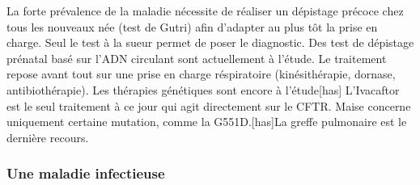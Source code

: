 \documentclass[12pt,a4paper]{article}
\begin{document}
La forte prévalence de la maladie nécessite de réaliser un dépistage précoce chez tous les nouveaux née (test de Gutri) afin d’adapter au plus tôt la prise en charge. Seul le test à la sueur permet de poser le diagnostic. Des test de dépistage prénatal basé sur l’ADN circulant sont actuellement à l’étude. Le traitement repose avant tout sur une prise en charge réspiratoire (kinésithérapie, dornase, antibiothérapie).
Les thérapies génétiques sont encore à l’étude[has]
L’Ivacaftor est le seul traitement à ce jour qui agit directement sur le CFTR. Maise concerne uniquement certaine mutation, comme la G551D.[has]La greffe pulmonaire est le dernière recours.

\subsubsection{Une maladie infectieuse}
\end{document}
